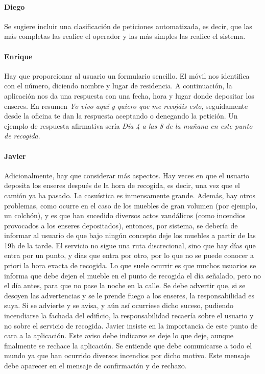 \paragraph{Diego} Se sugiere incluir una clasificación de peticiones automatizada, es decir, que las más completas las realice el operador y las más simples las realice el sistema.
 
\paragraph{Enrique} Hay que proporcionar al usuario un formulario sencillo. El móvil nos identifica con el número, diciendo nombre y lugar de residencia. A continuación, la aplicación nos da una respuesta con una fecha, hora y lugar donde depositar los enseres. En resumen \textit{Yo vivo aquí y quiero que me recojáis esto}, seguidamente desde la oficina te dan la respuesta aceptando o denegando la petición. Un ejemplo de respuesta afirmativa sería \textit{Día 4 a las 8 de la mañana en este punto de recogida}.
 
\paragraph{Javier} Adicionalmente, hay que considerar más aspectos. Hay veces en que el usuario deposita los enseres después de la hora de recogida, es decir, una vez que el camión ya ha pasado. La casuística es inmensamente grande. Además, hay otros problemas, como ocurre en el caso de los muebles de gran volumen (por ejemplo, un colchón), y es que han sucedido diversos actos vandálicos (como incendios provocados a los enseres depositados), entonces, por sistema, se debería de informar al usuario de que bajo ningún concepto deje los muebles a partir de las 19h de la tarde. El servicio no sigue una ruta discrecional, sino que hay días que entra por un punto, y días que entra por otro, por lo que no se puede conocer a priori la hora exacta de recogida. Lo que suele ocurrir es que muchos usuarios se informa que debe dejen el mueble en el punto de recogida el día señalado, pero no el día antes, para que no pase la noche en la calle. Se debe advertir que, si se desoyen las advertencias y se le prende fuego a los enseres, la responsabilidad es suya. Si se advierte y se avisa, y aún así ocurriese dicho suceso, pudiendo incendiarse la fachada del edificio, la responsabilidad recaería sobre el usuario y no sobre el servicio de recogida. Javier insiste en la importancia de este punto de cara a la aplicación. Este aviso debe indicarse se deje lo que deje, aunque finalmente se rechace la aplicación. Se entiende que debe comunicarse a todo el mundo ya que han ocurrido diversos incendios por dicho motivo. Este mensaje debe aparecer en el mensaje de confirmación y de rechazo.
 
